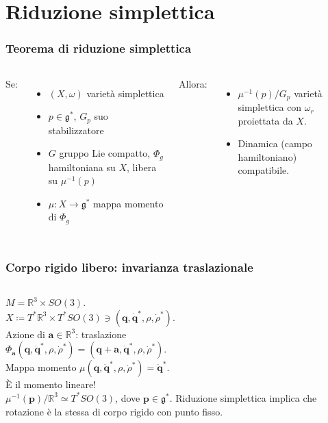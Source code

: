 \documentclass[]{beamer}
\newcommand{\R}{\mathbb{R}}
\renewcommand{\vec}[1]{\boldsymbol{#1}}
\newcommand{\defeq}{\coloneq}
\begin{document}
\section{Riduzione simplettica}

\begin{frame}
  \frametitle{Teorema di riduzione simplettica}
  \begin{columns}
    Se:
    \begin{itemize}
      \item $(X, \omega)$ varietà simplettica
      \item $p \in \mathfrak{g^*}$, $G_p$ suo stabilizzatore
      \item $G$ gruppo Lie compatto, $\Phi_g$ hamiltoniana su $X$, libera su $\mu^{-1}(p)$
      \item $\mu: X \to \mathfrak{g}^*$ mappa momento di $\Phi_g$
    \end{itemize}
    Allora:
    \begin{itemize}
      \item $\mu^{-1}(p)/G_p$ \alert{varietà simplettica} con $\omega_r$ proiettata da $X$.
      \item Dinamica (campo hamiltoniano) compatibile.
    \end{itemize}
      \begin{center}
            
      \end{center}
  \end{columns}
\end{frame}

\begin{frame}
\frametitle{Corpo rigido libero: invarianza traslazionale}
\begin{columns}
  $M = \R^3 \times SO(3)$.\\ $X \defeq T^* \R^3 \times T^*SO(3) \ni (\vec{q}, \vec{\dot{q}}^*, \rho, \dot{\rho}^*)$.\\[5pt]
  Azione di $\vec{a} \in \R^3$: traslazione\\ $\Phi_{\vec{a}}(\vec{q}, \vec{\dot{q}}^*, \rho, \dot{\rho}^*) = (\vec{q}+\vec{a}, \vec{\dot{q}}^*, \rho, \dot{\rho}^*)$.\\[5pt]
  Mappa momento $\mu(\vec{q}, \vec{\dot{q}}^*, \rho, \dot{\rho}^*) = \vec{\dot{q}}^*$.\\ È il \alert{momento lineare}!\\[11pt]
  $\mu^{-1}(\vec{p})/\R^3 \simeq T^* SO(3)$, dove $\vec{p} \in \mathfrak{g}^*$. Riduzione simplettica implica che rotazione è la stessa di corpo rigido con punto fisso.
    \begin{center}
          
    \end{center}
\end{columns}
\end{frame}
\end{document}
